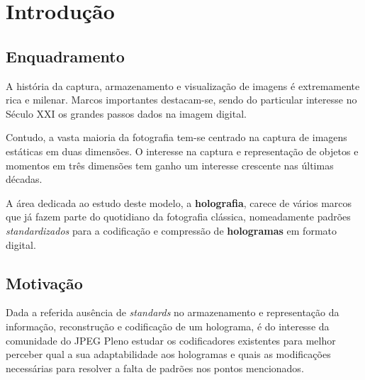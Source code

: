 \chapter{Introdução}
\label{chap:intro}

\section{Enquadramento}
\label{sec:amb} 

\begin{comment}
  Os acrónimos devem ser definidos recorrendo ao pacote (\emph{package}) \texttt  {acronym}, usando os comandos \texttt{\textbackslash acro}, \texttt {\textbackslash ac}, \texttt{\textbackslash acp}, etc. E.g., \emph{The   subject of this report is network protocols, namely \ac{TCP}.  \ac{TCP} is  studied for several aspects of performance.}

  Este relatório foi feito no contexto da unidade curricular de projeto da \ac  {UBI}. Foi na \ac{UBI} que desenvolvi todo o trabalho. \ac{CFIUTE}
\end{comment}

A história da captura, armazenamento e visualização de imagens é extremamente rica e milenar. Marcos importantes destacam-se, sendo do particular interesse no Século XXI os grandes passos dados na imagem digital.

Contudo, a vasta maioria da fotografia tem-se centrado na captura de imagens estáticas em duas dimensões. O interesse na captura e representação de objetos e momentos em três dimensões tem ganho um interesse crescente nas últimas décadas.

A área dedicada ao estudo deste modelo, a \textbf{holografia}, carece de vários marcos que já fazem parte do quotidiano da fotografia clássica, nomeadamente padrões \textit{standardizados} para a codificação e compressão de \textbf{hologramas} em formato digital.


\section{Motivação}
\label{sec:mot}
Dada a referida ausência de \textit{standards} no armazenamento e representação da informação, reconstrução e codificação de um holograma, é do interesse da comunidade do JPEG Pleno estudar os codificadores existentes para melhor perceber qual a sua adaptabilidade aos hologramas e quais as modificações necessárias para resolver a falta de padrões nos pontos mencionados.


